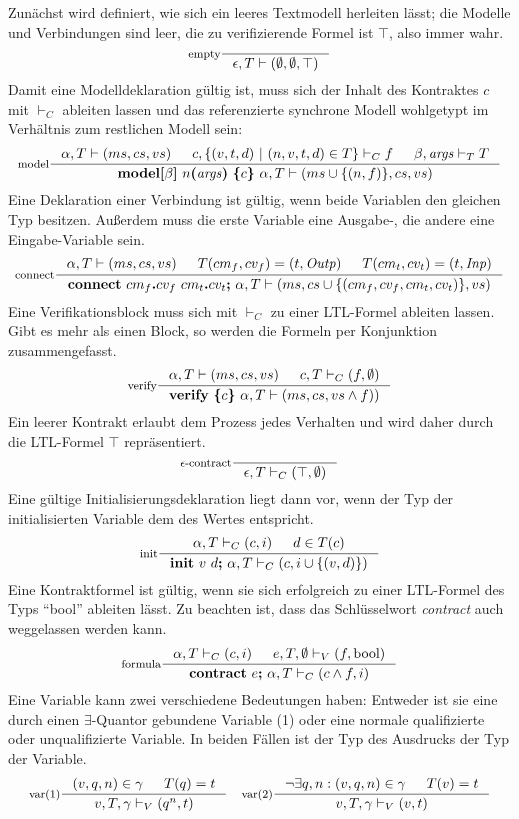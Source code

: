 Zunächst wird definiert, wie sich ein leeres Textmodell herleiten lässt; die Modelle und Verbindungen sind leer, die zu verifizierende Formel ist $\top$, also immer wahr.
\[
\inference[empty]{}{\epsilon,T\vdash (\emptyset,\emptyset,\top)}
\]
Damit eine Modelldeklaration gültig ist, muss sich der Inhalt des Kontraktes $c$ mit $\vdash_C$ ableiten lassen und das referenzierte synchrone Modell wohlgetypt im Verhältnis zum restlichen Modell sein:
\[
\inference[model]{\alpha,T \vdash(ms,cs,vs) & c,\{ (v,t,d)\ |\ (n,v,t,d)\in T \}\vdash_C f & \beta,\mathit{args}\vdash_T T}{\textbf{model[}\beta\textbf{]}\ n\textbf{(}\mathit{args}\textbf{)}\ \textbf{\{} c\textbf{\}}\ \alpha,T\vdash(ms\cup\{(n,f)\},cs,vs)}
\]
Eine Deklaration einer Verbindung ist gültig, wenn beide Variablen den gleichen Typ besitzen.
Außerdem muss die erste Variable eine Ausgabe-, die andere eine Eingabe-Variable sein.
\[
\inference[connect]{\alpha,T\vdash(ms,cs,vs) & T(cm_f,cv_f)=(t,\mathit{Outp}) & T(cm_t,cv_t) = (t,\mathit{Inp})}{\textbf{connect}\ cm_f\textbf{.}cv_f\ cm_t\textbf{.}cv_t\textbf{;}\ \alpha,T\vdash(ms,cs\cup\{(cm_f,cv_f,cm_t,cv_t)\},vs)}
\]
Eine Verifikationsblock muss sich mit $\vdash_C$ zu einer LTL-Formel ableiten lassen.
Gibt es mehr als einen Block, so werden die Formeln per Konjunktion zusammengefasst.
\[
\inference[verify]{\alpha,T\vdash(ms,cs,vs) & c,T\vdash_C (f,\emptyset)}{\textbf{verify}\ \textbf{\{}c\textbf{\}}\ \alpha,T\vdash (ms,cs,vs\land f))}
\]
Ein leerer Kontrakt erlaubt dem Prozess jedes Verhalten und wird daher durch die LTL-Formel $\top$ repräsentiert.
\[
\inference[$\epsilon$-contract]{}{\epsilon,T\vdash_C (\top,\emptyset)}
\]
Eine gültige Initialisierungsdeklaration liegt dann vor, wenn der Typ der initialisierten Variable dem des Wertes entspricht.
\[
\inference[init]{\alpha,T\vdash_C (c,i) & d\in T(c)}{\textbf{init}\ v\ d\textbf{;}\ \alpha,T\vdash_C (c,i\cup\{(v,d)\})}
\]
Eine Kontraktformel ist gültig, wenn sie sich erfolgreich zu einer LTL-Formel des Typs "`bool"' ableiten lässt.
Zu beachten ist, dass das Schlüsselwort \emph{contract} auch weggelassen werden kann.
\[
\inference[formula]{\alpha,T\vdash_C (c,i) & e,T,\emptyset\vdash_V (f,\textrm{bool})}{\textbf{contract}\ e\textbf{;}\ \alpha,T\vdash_C (c\land f,i)}
\]
Eine Variable kann zwei verschiedene Bedeutungen haben:
Entweder ist sie eine durch einen $\exists$-Quantor gebundene Variable (1) oder eine normale qualifizierte oder unqualifizierte Variable.
In beiden Fällen ist der Typ des Ausdrucks der Typ der Variable.
\[
\begin{array}{ll}
  \inference[var(1)]{(v,q,n)\in\gamma & T(q)=t}{v,T,\gamma\vdash_V (q^n,t)} &
  \inference[var(2)]{\lnot\exists q,n: (v,q,n)\in\gamma & T(v)=t}{v,T,\gamma\vdash_V (v,t)}
\end{array}
\]
